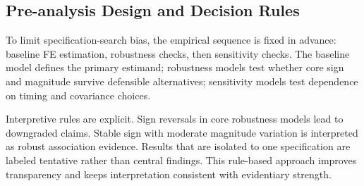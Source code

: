 \subsection{Pre-analysis Design and Decision Rules}

To limit specification-search bias, the empirical sequence is fixed in advance: baseline FE estimation, robustness checks, then sensitivity checks. The baseline model defines the primary estimand; robustness models test whether core sign and magnitude survive defensible alternatives; sensitivity models test dependence on timing and covariance choices.

Interpretive rules are explicit. Sign reversals in core robustness models lead to downgraded claims. Stable sign with moderate magnitude variation is interpreted as robust association evidence. Results that are isolated to one specification are labeled tentative rather than central findings. This rule-based approach improves transparency and keeps interpretation consistent with evidentiary strength.
